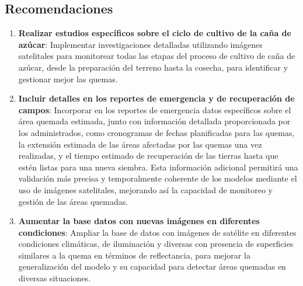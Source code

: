 \subsection{Recomendaciones}

\begin{enumerate}
    \item \textbf{Realizar estudios específicos sobre el ciclo de cultivo de la caña de azúcar}: Implementar investigaciones detalladas utilizando imágenes satelitales para monitorear todas las etapas del proceso de cultivo de caña de azúcar, desde la preparación del terreno hasta la cosecha, para identificar 
    y gestionar mejor las quemas.

    \item \textbf{Incluir detalles en los reportes de emergencia y de recuperación de campos}: Incorporar en los reportes de emergencia datos específicos sobre el área quemada estimada, junto con información detallada proporcionada por los administrados, como cronogramas de fechas planificadas para las quemas, 
    la extensión estimada de las áreas afectadas por las quemas una vez realizadas, y el tiempo estimado de recuperación de las tierras hasta que estén listas para una nueva siembra. Esta información adicional permitirá una validación más precisa y temporalmente coherente de los modelos mediante el uso de imágenes 
    satelitales, mejorando así la capacidad de monitoreo y gestión de las áreas quemadas.

    \item \textbf{Aumentar la base datos con nuevas imágenes en diferentes condiciones}: Ampliar la base de datos con imágenes de satélite en diferentes condiciones climáticas, de iluminación y diversas con presencia de superficies similares a la quema en términos de reflectancia, para mejorar la generalización 
    del modelo y su capacidad para detectar áreas quemadas en diversas situaciones.

\end{enumerate}



